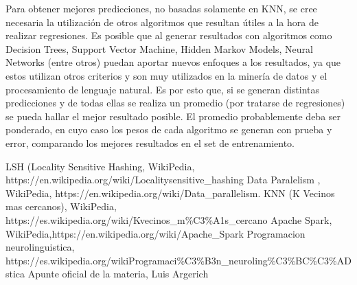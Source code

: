 \documentclass[a4paper,10pt]{article}
\begin{document}
	Para obtener mejores predicciones, no basadas solamente en KNN, se cree necesaria la utilizaci\'{o}n de otros algoritmos que resultan \'{u}tiles a la hora de realizar regresiones. Es posible que al generar resultados con algoritmos como Decision Trees, Support Vector Machine, Hidden Markov Models, Neural Networks (entre otros) puedan aportar nuevos enfoques a los resultados, ya que estos utilizan otros criterios y son muy utilizados en la miner\'{i}a de datos y el procesamiento de lenguaje natural. Es por esto que, si se generan distintas predicciones y de todas ellas se realiza un promedio (por tratarse de regresiones) se pueda hallar el mejor resultado posible. El promedio probablemente deba ser ponderado, en cuyo caso los pesos de cada algoritmo se generan con prueba y error, comparando los mejores resultados en el set de entrenamiento.
	
	\begin{thebibliography}{99}
		 LSH (Locality Sensitive Hashing, WikiPedia, https://en.wikipedia.org/wiki/Locality\-sensitive\_hashing
		 Data Paralelism , WikiPedia, https://en.wikipedia.org/wiki/Data\_parallelism.
		 KNN (K Vecinos mas cercanos), WikiPedia, https://es.wikipedia.org/wiki/K\-vecinos\_m\%C3\%A1s\_cercano
		 Apache Spark, WikiPedia,https://en.wikipedia.org/wiki/Apache\_Spark
		 Programacion neurolinguistica, https://es.wikipedia.org/wikiProgramaci\%C3\%B3n\_neuroling\%C3\%BC\%C3\%ADstica
		 Apunte oficial de la materia, Luis Argerich

	\end{thebibliography}
	
\end{document}

